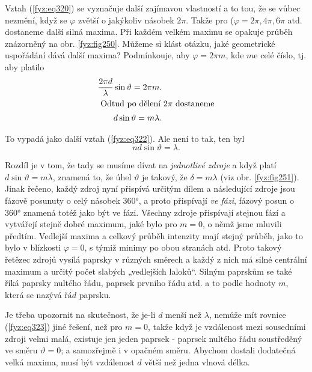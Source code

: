 {    Vztah (\ref{fyz:eq320}) se vyznačuje další zajímavou vlastností a to tou, že se vůbec nezmění, 
    když se \(\varphi\) zvětší o jakýkoliv násobek \(2\pi\). Takže pro (\(\varphi = 2\pi, 4\pi, 
    6\pi\) atd. dostaneme další silná maxima. Při každém velkém maximu se opakuje průběh znázorněný 
    na obr. \ref{fyz:fig250}. Můžeme si klást otázku, jaké geometrické uspořádání dává další 
    maxima? Podmínkouje, aby \(\varphi=2\pi m\), kde \(m\)e celé číslo, tj. aby platilo
    \begin{align}
      \frac{2\pi d}{\lambda}\sin\vartheta = 2\pi m.         \nonumber \\
      \shortintertext{ Odtud po dělení \(2\pi\) dostaneme}  
      d\sin\vartheta = m\lambda.                            \label{fyz:eq323}
    \end{align}

    To vypadá jako další vztah (\ref{fyz:eq322}). Ale není to tak, ten byl 
    \begin{equation*}
      nd\sin\vartheta = \lambda.
    \end{equation*}
    
    Rozdíl je v tom, že tady se musíme dívat na \emph{jednotlivé zdroje} a když platí 
    \(d\sin\vartheta = m\lambda\), znamená to, že úhel \(\vartheta\) je takový, že \(\delta= 
    m\lambda\) (viz obr. \ref{fyz:fig251}). Jinak řečeno, každý zdroj nyní přispívá určitým dílem a 
    následující zdroje jsou fázově posunuty o celý násobek \ang{360}, a proto přispívají 
    \emph{ve fázi}, fázový posun o \ang{360} znamená totéž jako být ve fázi. Všechny zdroje 
    přispívají stejnou fází a vytvářejí stejně dobré maximum, jaké bylo pro \(m = 0\), o němž jsme 
    mluvili předtím. Vedlejší maxima a celkový průběh intenzity mají stejný průběh, jako to bylo v 
    blízkosti \(\varphi = 0\), s týmiž minimy po obou stranách atd. Proto takový řetězec zdrojů 
    vysílá paprsky v různých směrech a každý z nich má silné centrální maximum a určitý počet 
    slabých „vedlejších laloků“. Silným paprskům se také říká paprsky nultého řádu, paprsek prvního 
    řádu atd. a to podle hodnoty \(m\), která se nazývá \(řád\) paprsku.
    
    Je třeba upozornit na skutečnost, že je-li \(d\) menší než \(\lambda\), nemůže mít rovnice 
    (\ref{fyz:eq323}) jiné řešení, než pro \(m = 0\), takže když je vzdálenost mezi sousedními 
    zdroji velmi malá, existuje jen jeden paprsek - paprsek nultého řádu soustředěný ve směru 
    \(\vartheta = 0\); a samozřejmě i v opačném směru. Abychom dostali dodatečná velká maxima, musí 
    být vzdálenost \(d\) větší než jedna vlnová délka.
    
}
